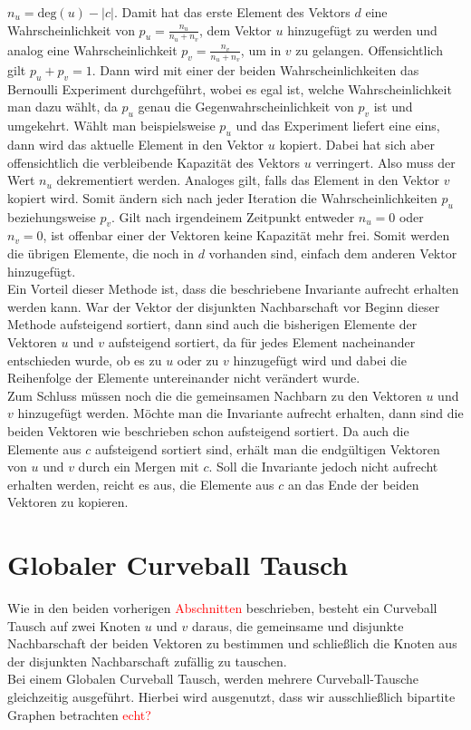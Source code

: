 $n_u= \text{deg}(u) - |c|$.
Damit hat das erste Element des Vektors $d$ eine Wahrscheinlichkeit von $p_u = \frac{n_u}{n_u+n_v}$, dem
Vektor $u$ hinzugefügt zu werden und analog eine Wahrscheinlichkeit $p_v = \frac{n_v}{n_u+n_v}$, um
in $v$ zu gelangen. Offensichtlich gilt $p_u + p_v = 1$. Dann wird mit einer der beiden
Wahrscheinlichkeiten das Bernoulli Experiment durchgeführt, wobei es egal ist, welche Wahrscheinlichkeit
man dazu wählt, da $p_u$ genau die Gegenwahrscheinlichkeit von $p_v$ ist und umgekehrt. 
Wählt man beispielsweise $p_u$ und das Experiment liefert eine eins, dann wird das aktuelle Element
in den Vektor $u$ kopiert. Dabei
hat sich aber offensichtlich die verbleibende Kapazität des Vektors $u$ verringert. Also muss
der Wert $n_u$ dekrementiert werden. Analoges gilt, falls das Element in den Vektor $v$ kopiert wird.
Somit ändern sich nach jeder Iteration die Wahrscheinlichkeiten $p_u$ beziehungsweise $p_v$.
Gilt nach irgendeinem Zeitpunkt entweder $n_u = 0$ oder $n_v = 0$, ist offenbar einer der Vektoren 
keine Kapazität mehr frei. Somit werden die übrigen Elemente, die noch in $d$ vorhanden sind, 
einfach dem anderen Vektor hinzugefügt.
\\
Ein Vorteil dieser Methode ist, dass die beschriebene Invariante aufrecht erhalten werden kann.
War der Vektor der disjunkten Nachbarschaft vor Beginn dieser Methode aufsteigend sortiert,
dann sind auch die bisherigen Elemente der Vektoren $u$ und $v$ aufsteigend sortiert, da für jedes
Element nacheinander entschieden wurde, ob es zu $u$ oder zu $v$ hinzugefügt wird und dabei die
Reihenfolge der Elemente untereinander nicht verändert wurde.
\\
Zum Schluss müssen noch die die gemeinsamen Nachbarn zu den Vektoren $u$ und $v$ hinzugefügt werden.
Möchte man die Invariante aufrecht erhalten, dann sind die beiden Vektoren wie beschrieben schon
aufsteigend sortiert. Da auch die Elemente aus $c$ aufsteigend sortiert sind, erhält man
die endgültigen Vektoren von $u$ und $v$ durch ein Mergen mit $c$. Soll die Invariante jedoch
nicht aufrecht erhalten werden, reicht es aus, die Elemente aus $c$ an das Ende der beiden Vektoren
zu kopieren.




\section{Globaler Curveball Tausch}
Wie in den beiden vorherigen \textcolor{red}{Abschnitten} beschrieben, besteht ein Curveball Tausch auf zwei Knoten $u$ und $v$ daraus, die gemeinsame und disjunkte Nachbarschaft der beiden Vektoren zu bestimmen
und schließlich die Knoten aus der disjunkten Nachbarschaft zufällig zu tauschen.
\\
Bei einem Globalen Curveball Tausch, werden mehrere Curveball-Tausche gleichzeitig ausgeführt.
Hierbei wird ausgenutzt, dass wir ausschließlich bipartite Graphen betrachten \textcolor{red}{echt?}


